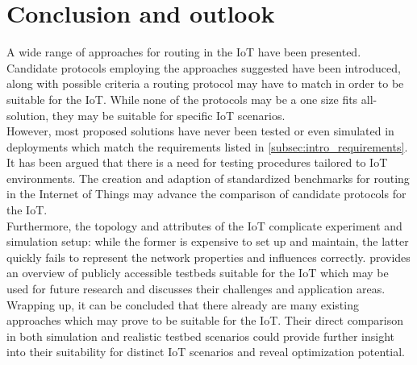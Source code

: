 \section{Conclusion and outlook}
\label{sec:conclusion}
A wide range of approaches for routing in the \gls{IoT} have been presented. Candidate protocols employing the approaches suggested have been introduced, along with possible criteria a routing protocol may have to match in order to be suitable for the IoT. While none of the protocols may be a one size fits all-solution, they may be suitable for specific IoT scenarios.\\
However, most proposed solutions have never been tested or even simulated in deployments which match the requirements listed in \ref{subsec:intro_requirements}.
It has been argued that there is a need for testing procedures tailored to IoT environments. The creation and adaption of standardized benchmarks for routing in the Internet of Things may advance the comparison of candidate protocols for the IoT.\\
Furthermore, the topology and attributes of the IoT complicate experiment and simulation setup: while the former is expensive to set up and maintain, the latter quickly fails to represent the network properties and influences correctly. \cite{iot_experiment_facilities} provides an overview of publicly accessible testbeds suitable for the IoT which may be used for future research and discusses their challenges and application areas.\\
Wrapping up, it can be concluded that there already are many existing approaches which may prove to be suitable for the IoT. Their direct comparison in both simulation and realistic testbed scenarios could provide further insight into their suitability for distinct IoT scenarios and reveal optimization potential.